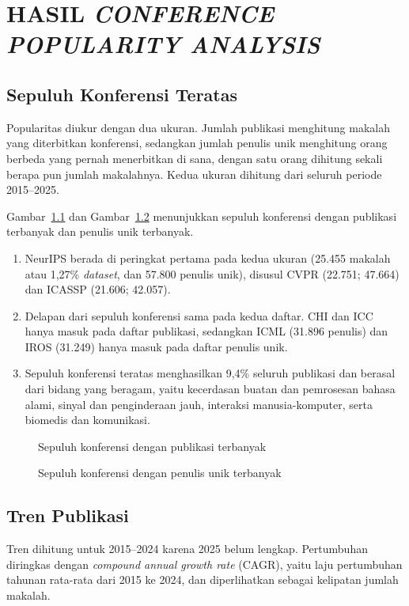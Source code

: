 \chapter{HASIL \textit{CONFERENCE POPULARITY ANALYSIS}}
\label{chap:popularitas}\label{sec:hasil-t2}

\section{Sepuluh Konferensi Teratas}
\label{sec:hasil-top}
Popularitas diukur dengan dua ukuran. Jumlah publikasi menghitung makalah yang diterbitkan konferensi, sedangkan jumlah penulis unik menghitung orang berbeda yang pernah menerbitkan di sana, dengan satu orang dihitung sekali berapa pun jumlah makalahnya. Kedua ukuran dihitung dari seluruh periode 2015--2025.

Gambar~\ref{fig:top-pub} dan Gambar~\ref{fig:top-author} menunjukkan sepuluh konferensi dengan publikasi terbanyak dan penulis unik terbanyak.
\begin{enumerate}
\item NeurIPS berada di peringkat pertama pada kedua ukuran (25.455 makalah atau 1,27\% \textit{dataset}, dan 57.800 penulis unik), disusul CVPR (22.751; 47.664) dan ICASSP (21.606; 42.057).
\item Delapan dari sepuluh konferensi sama pada kedua daftar. CHI dan ICC hanya masuk pada daftar publikasi, sedangkan ICML (31.896 penulis) dan IROS (31.249) hanya masuk pada daftar penulis unik.
\item Sepuluh konferensi teratas menghasilkan 9,4\% seluruh publikasi dan berasal dari bidang yang beragam, yaitu kecerdasan buatan dan pemrosesan bahasa alami, sinyal dan penginderaan jauh, interaksi manusia-komputer, serta biomedis dan komunikasi.
\end{enumerate}

\begin{figure}[!htb]
\centering
{}
\caption{Sepuluh konferensi dengan publikasi terbanyak}
\label{fig:top-pub}
\end{figure}

\begin{figure}[!htb]
\centering
{}
\caption{Sepuluh konferensi dengan penulis unik terbanyak}
\label{fig:top-author}
\end{figure}

\section{Tren Publikasi}
\label{sec:hasil-tren}
Tren dihitung untuk 2015--2024 karena 2025 belum lengkap. Pertumbuhan diringkas dengan \textit{compound annual growth rate} (CAGR), yaitu laju pertumbuhan tahunan rata-rata dari 2015 ke 2024, dan diperlihatkan sebagai kelipatan jumlah makalah.

